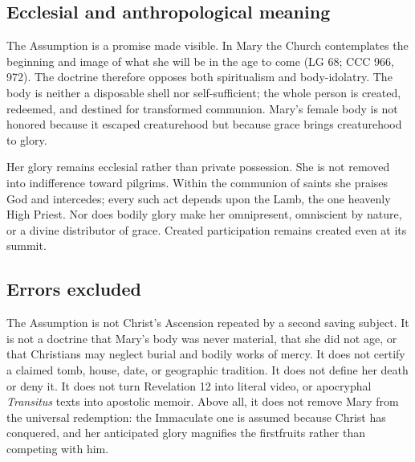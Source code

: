 \subsection{Ecclesial and anthropological meaning}

The Assumption is a promise made visible. In Mary the Church contemplates the beginning and image of what she will be in the age to come (LG 68; CCC 966, 972). The doctrine therefore opposes both spiritualism and body-idolatry. The body is neither a disposable shell nor self-sufficient; the whole person is created, redeemed, and destined for transformed communion. Mary's female body is not honored because it escaped creaturehood but because grace brings creaturehood to glory.

Her glory remains ecclesial rather than private possession. She is not removed into indifference toward pilgrims. Within the communion of saints she praises God and intercedes; every such act depends upon the Lamb, the one heavenly High Priest. Nor does bodily glory make her omnipresent, omniscient by nature, or a divine distributor of grace. Created participation remains created even at its summit.

\subsection{Errors excluded}

The Assumption is not Christ's Ascension repeated by a second saving subject. It is not a doctrine that Mary's body was never material, that she did not age, or that Christians may neglect burial and bodily works of mercy. It does not certify a claimed tomb, house, date, or geographic tradition. It does not define her death or deny it. It does not turn Revelation 12 into literal video, or apocryphal \emph{Transitus} texts into apostolic memoir. Above all, it does not remove Mary from the universal redemption: the Immaculate one is assumed because Christ has conquered, and her anticipated glory magnifies the firstfruits rather than competing with him.

